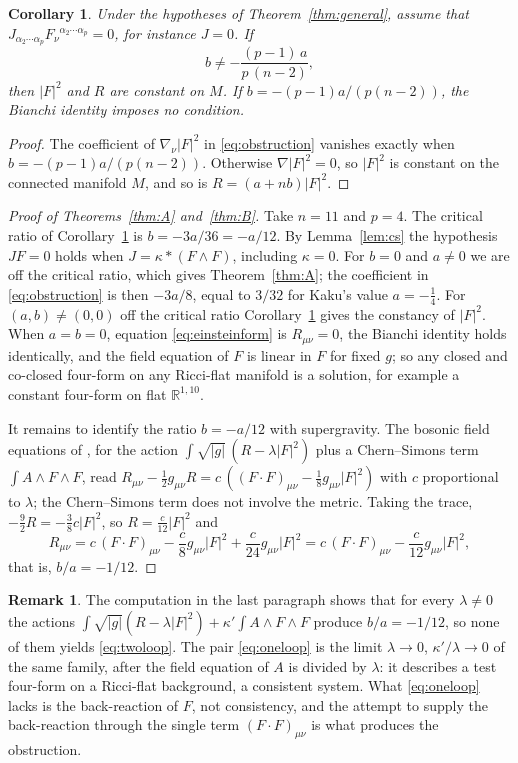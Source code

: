 \documentclass[11pt]{amsart}
\newtheorem{corollary}[theorem]{Corollary}
\theoremstyle{definition}
\newtheorem{remark}[theorem]{Remark}
\newcommand{\RR}{\mathbb{R}}
\newcommand{\FF}{(F\!\cdot\! F)}
\begin{document}
\begin{corollary}\label{cor:const}
Under the hypotheses of Theorem~\ref{thm:general}, assume that $J_{\alpha_2\cdots\alpha_p}F_\nu{}^{\alpha_2\cdots\alpha_p}=0$, for instance $J=0$. If
\[
b\ne-\frac{(p-1)\,a}{p\,(n-2)},
\]
then $|F|^2$ and $R$ are constant on $M$. If $b=-(p-1)a/(p(n-2))$, the Bianchi identity imposes no condition.
\end{corollary}

\begin{proof}
The coefficient of $\nabla_\nu|F|^2$ in \eqref{eq:obstruction} vanishes exactly when $b=-(p-1)a/(p(n-2))$. Otherwise $\nabla|F|^2=0$, so $|F|^2$ is constant on the connected manifold $M$, and so is $R=(a+nb)|F|^2$.
\end{proof}

\begin{proof}[Proof of Theorems~\ref{thm:A} and~\ref{thm:B}]
Take $n=11$ and $p=4$. The critical ratio of Corollary~\ref{cor:const} is $b=-3a/36=-a/12$. By Lemma~\ref{lem:cs} the hypothesis $JF=0$ holds when $J=\kappa\ast(F\wedge F)$, including $\kappa=0$. For $b=0$ and $a\ne0$ we are off the critical ratio, which gives Theorem~\ref{thm:A}; the coefficient in \eqref{eq:obstruction} is then $-3a/8$, equal to $3/32$ for Kaku's value $a=-\frac14$. For $(a,b)\neq(0,0)$ off the critical ratio Corollary~\ref{cor:const} gives the constancy of $|F|^2$. When $a=b=0$, equation \eqref{eq:einsteinform} is $R_{\mu\nu}=0$, the Bianchi identity holds identically, and the field equation of $F$ is linear in $F$ for fixed $g$; so any closed and co-closed four-form on any Ricci-flat manifold is a solution, for example a constant four-form on flat $\RR^{1,10}$.

It remains to identify the ratio $b=-a/12$ with supergravity. The bosonic field equations of \cite{CJS78}, for the action $\int\sqrt{|g|}\,(R-\lambda|F|^2)$ plus a Chern--Simons term $\int A\wedge F\wedge F$, read $R_{\mu\nu}-\frac12g_{\mu\nu}R=c\,(\FF_{\mu\nu}-\frac18g_{\mu\nu}|F|^2)$ with $c$ proportional to $\lambda$; the Chern--Simons term does not involve the metric. Taking the trace, $-\frac92R=-\frac38c|F|^2$, so $R=\frac{c}{12}|F|^2$ and
\[
R_{\mu\nu}=c\,\FF_{\mu\nu}-\frac{c}{8}g_{\mu\nu}|F|^2+\frac{c}{24}g_{\mu\nu}|F|^2=c\,\FF_{\mu\nu}-\frac{c}{12}g_{\mu\nu}|F|^2 ,
\]
that is, $b/a=-1/12$.
\end{proof}

\begin{remark}\label{rem:action}
The computation in the last paragraph shows that for every $\lambda\neq0$ the actions $\int\sqrt{|g|}(R-\lambda|F|^2)+\kappa'\int A\wedge F\wedge F$ produce $b/a=-1/12$, so none of them yields \eqref{eq:twoloop}. The pair \eqref{eq:oneloop} is the limit $\lambda\to0$, $\kappa'/\lambda\to0$ of the same family, after the field equation of $A$ is divided by $\lambda$: it describes a test four-form on a Ricci-flat background, a consistent system. What \eqref{eq:oneloop} lacks is the back-reaction of $F$, not consistency, and the attempt to supply the back-reaction through the single term $\FF_{\mu\nu}$ is what produces the obstruction.
\end{remark}
\end{document}
